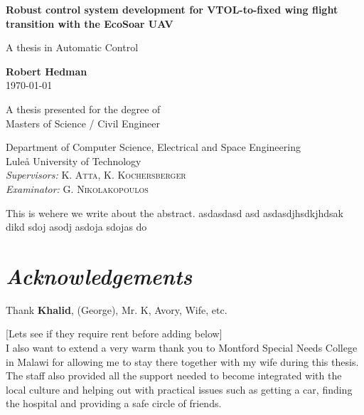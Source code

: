 \documentclass{article}
\begin{document}
\begin{titlepage}
    \begin{center}
 
        \huge
        \textbf{Robust control system development for VTOL-to-fixed wing flight transition with the EcoSoar UAV}
 
        \vspace{0.5cm}
        \LARGE
        A thesis in Automatic Control
 
        \vspace{1.5cm}
 
        \textbf{Robert Hedman\\}
        \today
 
        \vfill
 
        A thesis presented for the degree of\\
        Masters of Science / Civil Engineer
 
        \vspace{0.8cm}
 
 
        \Large
        Department of Computer Science, Electrical and Space Engineering\\
        Luleå University of Technology\\
        \textit{Supervisors:} K. \textsc{Atta}, K. \textsc{Kochersberger}\\
        \textit{Examinator:} G. \textsc{Nikolakopoulos}
 
    \end{center}
\end{titlepage}

\abstract
This is wehere we write about the abstract.
asdasdasd
asd
asdasdjhsdkjhdsak dikd  sdoj asodj asdoja sdojas do

\newpage
\section*{\textit{Acknowledgements}}

Thank \textbf{Khalid}, (George), Mr. K, Avory, Wife, etc.

[Lets see if they require rent before adding below]\\
I also want to extend a very warm thank you to Montford Special Needs College in Malawi for allowing me to stay there together with my wife during this thesis.
The staff also provided all the support needed to become integrated with the local culture and helping out with practical issues such as getting a car, finding the hospital and providing a safe circle of friends.
\end{document}
